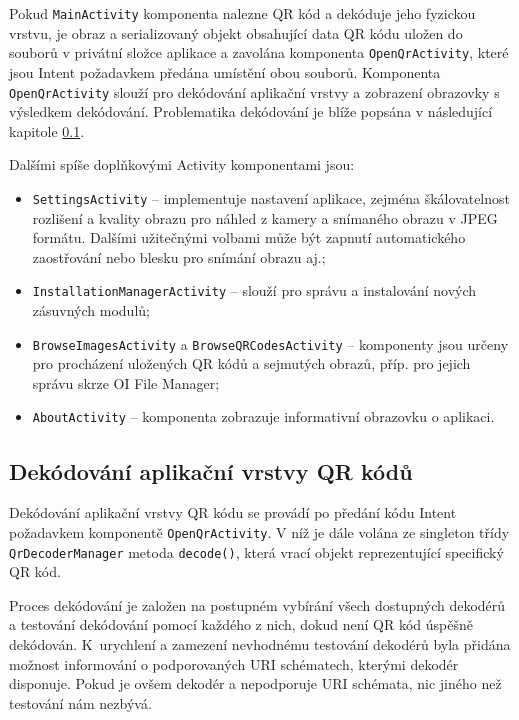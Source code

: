 Pokud \texttt{MainActivity} komponenta nalezne QR kód a dekóduje jeho fyzickou
vrstvu, je obraz a serializovaný objekt obsahující data QR kódu uložen do
souborů v privátní složce aplikace a zavolána komponenta
\texttt{OpenQrActivity}, které jsou Intent požadavkem předána umístění obou
souborů. Komponenta \texttt{OpenQrActivity} slouží pro dekódování aplikační
vrstvy a zobrazení obrazovky s výsledkem dekódování. Problematika dekódování je blíže
popsána v následující kapitole \ref{aplikaceDekodovani}.

\bigskip \noindent Dalšími spíše doplňkovými Activity komponentami jsou:

\begin{itemize}
  \item \texttt{SettingsActivity} -- implementuje nastavení aplikace, zejména
  škálovatelnost rozlišení a kvality obrazu pro náhled z kamery a snímaného obrazu v JPEG formátu. Dalšími užitečnými volbami může být zapnutí automatického zaostřování nebo blesku pro snímání obrazu aj.;
  \item \texttt{InstallationManagerActivity} -- slouží pro správu a instalování
  nových zásuvných modulů;
  \item \texttt{BrowseImagesActivity} a \texttt{BrowseQRCodesActivity} --
  komponenty jsou určeny pro procházení uložených QR kódů a sejmutých obrazů, příp. pro jejich správu skrze OI File Manager;
  \item \texttt{AboutActivity} -- komponenta zobrazuje informativní obrazovku o
  aplikaci.
\end{itemize}

\subsection{Dekódování aplikační vrstvy QR kódů}
\label{aplikaceDekodovani}

Dekódování aplikační vrstvy QR kódu se provádí po předání kódu Intent požadavkem 
komponentě \texttt{OpenQrActivity}. V níž je dále volána ze singleton třídy
\texttt{QrDecoderManager} metoda \texttt{decode()}, která vrací objekt
reprezentující specifický QR kód.

Proces dekódování je založen na postupném vybírání všech dostupných dekodérů a
testování dekódování pomocí každého z nich, dokud není QR kód úspěšně dekódován.
K~urychlení a zamezení nevhodnému testování dekodérů byla přidána možnost
informování o podporovaných URI schématech, kterými dekodér disponuje. Pokud je
ovšem dekodér  a nepodporuje URI schémata, nic jiného než
testování nám nezbývá.

